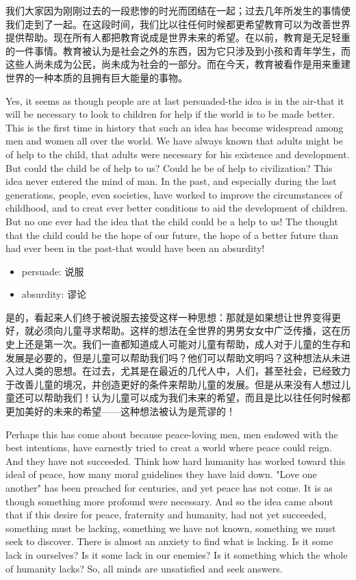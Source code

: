 \documentclass[lang=cn,10pt]{elegantbook}
\begin{document}
我们大家因为刚刚过去的一段悲惨的时光而团结在一起；过去几年所发生的事情使我们走到了一起。在这段时间，我们比以往任何时候都更希望教育可以为改善世界提供帮助。现在所有人都把教育说成是世界未来的希望。在以前，教育是无足轻重的一件事情。教育被认为是社会之外的东西，因为它只涉及到小孩和青年学生，而这些人尚未成为公民，尚未成为社会的一部分。而在今天，教育被看作是用来重建世界的一种本质的且拥有巨大能量的事物。

Yes, it seems as though people are at last persuaded-the idea is in the air-that it will be necessary to look to children for help if the world is to be made better. This is the first time in history that such an idea has become widespread among men and women all over the world. We have always known that adults might be of help to the child, that adults were necessary for his existence and development. But could the child be of help to us? Could he be of help to civilization? This idea never entered the mind of man. In the past, and especially during the last generations, people, even societies, have worked to improve the circumstances of childhood, and to creat ever better conditions to aid the development of children. But no one ever had the idea that the child could be a help to us! The thought that the child could be the hope of our future, the hope of a better future than had ever been in the past-that would have been an absurdity!

\begin{tcolorbox}
    \begin{itemize}
        \item persuade: 说服
        \item absurdity: 谬论
    \end{itemize}
\end{tcolorbox}

是的，看起来人们终于被说服去接受这样一种思想：那就是如果想让世界变得更好，就必须向儿童寻求帮助。这样的想法在全世界的男男女女中广泛传播，这在历史上还是第一次。我们一直都知道成人可能对儿童有帮助，成人对于儿童的生存和发展是必要的，但是儿童可以帮助我们吗？他们可以帮助文明吗？这种想法从未进入过人类的思想。在过去，尤其是在最近的几代人中，人们，甚至社会，已经致力于改善儿童的境况，并创造更好的条件来帮助儿童的发展。但是从来没有人想过儿童还可以帮助我们！认为儿童可以成为我们未来的希望，而且是比以往任何时候都更加美好的未来的希望——这种想法被认为是荒谬的！

Perhaps this has come about because peace-loving men, men endowed with the best intentions, have earnestly tried to creat a world where peace could reign. And they have not succeeded. Think how hard humanity has worked toward this ideal of peace, how many moral guidelines they have laid down. "Love one another" has been preached for centuries, and yet peace has not come. It is as though something more profound were necessary. And so the idea came about that if this desire for peace, fraternity and humanity, had not yet succeeded, something must be lacking, something we have not known, something we must seek to discover. There is almost an anxiety to find what is lacking. Is it some lack in ourselves? Is it some lack in our enemies? Is it something which the whole of humanity lacks? So, all minds are unsatisfied and seek answers.
\end{document}
